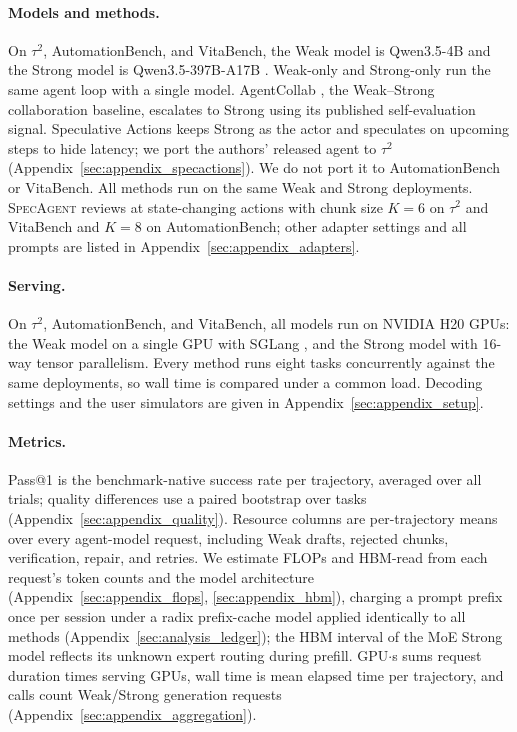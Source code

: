 \documentclass[11pt, copyright, logo, secondlogo]{template/lark}
\newcommand{\SpecAgent}{\textsc{SpecAgent}\xspace}
\begin{document}
\paragraph{Models and methods.}
On $\tau^2$, AutomationBench, and VitaBench, the Weak model is Qwen3.5-4B and the Strong
model is Qwen3.5-397B-A17B \citep{qwen2026qwen35}.
Weak-only and Strong-only run the same agent loop with a single model.
AgentCollab \citep{gao2026agentcollab}, the Weak--Strong collaboration
baseline, escalates to Strong using its published self-evaluation signal.
Speculative Actions \citep{ye2026specactions} keeps Strong as the actor and
speculates on upcoming steps to hide latency; we port the authors' released
agent to $\tau^2$ (Appendix~\ref{sec:appendix_specactions}). We do not port it to
AutomationBench or VitaBench. All methods run on the
same Weak and Strong deployments. \SpecAgent{} reviews at state-changing
actions with chunk size $K=6$ on $\tau^2$ and VitaBench and $K=8$ on AutomationBench; other
adapter settings and all prompts are listed in
Appendix~\ref{sec:appendix_adapters}.

\paragraph{Serving.}
On $\tau^2$, AutomationBench, and VitaBench, all models run on NVIDIA H20 GPUs: the Weak
model on a single GPU with SGLang \citep{zheng2024sglang}, and the Strong
model with 16-way tensor parallelism. Every method runs eight tasks
concurrently against the same deployments, so wall time is compared under a
common load. Decoding settings and the user simulators are given in
Appendix~\ref{sec:appendix_setup}.

\paragraph{Metrics.}
Pass@1 is the benchmark-native success rate per trajectory, averaged over
all trials; quality differences use a paired bootstrap over tasks
(Appendix~\ref{sec:appendix_quality}). Resource columns are per-trajectory
means over every agent-model request, including Weak drafts, rejected
chunks, verification, repair, and retries. We estimate FLOPs and
HBM-read from each request's token counts and the model architecture
(Appendix~\ref{sec:appendix_flops}, \ref{sec:appendix_hbm}), charging a
prompt prefix once per session under a radix prefix-cache model
\citep{zheng2024sglang} applied identically to all methods
(Appendix~\ref{sec:analysis_ledger}); the HBM interval of the MoE Strong model
reflects its unknown expert routing during prefill. GPU$\cdot$s sums request
duration times serving GPUs, wall time is mean elapsed time per trajectory,
and calls count Weak/Strong generation requests
(Appendix~\ref{sec:appendix_aggregation}).
\end{document}
